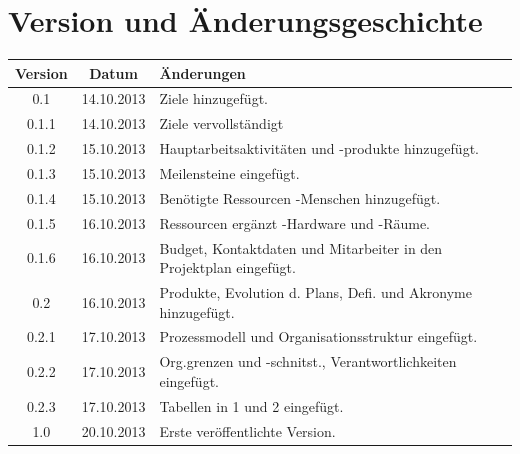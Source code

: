 \documentclass[fontsize=12pt,paper=a4,twoside]{scrartcl}
\begin{document}
\newpage

  \thispagestyle{fancy}
  \fancyhead{}
  \fancyfoot{}
  \renewcommand{\headrulewidth}{0.4pt}
  \tableofcontents

\newpage



\section*{Version und Änderungsgeschichte}



\begin{tabular}{ccl}
Version & Datum & Änderungen \\
\hline
0.1 & 14.10.2013 & Ziele hinzugefügt.\\
0.1.1 & 14.10.2013 & Ziele vervollständigt\\
0.1.2 & 15.10.2013 & Hauptarbeitsaktivitäten und -produkte hinzugefügt.\\
0.1.3 & 15.10.2013 & Meilensteine eingefügt.\\
0.1.4 & 15.10.2013 & Benötigte Ressourcen -Menschen hinzugefügt.\\
0.1.5 & 16.10.2013 & Ressourcen ergänzt -Hardware und -Räume.\\
0.1.6 & 16.10.2013 & Budget, Kontaktdaten und Mitarbeiter in den Projektplan eingefügt.\\
0.2 & 16.10.2013 &  Produkte, Evolution d. Plans, Defi. und Akronyme hinzugefügt.\\
0.2.1 & 17.10.2013 & Prozessmodell und Organisationsstruktur eingefügt.\\
0.2.2 & 17.10.2013 & Org.grenzen und -schnitst., Verantwortlichkeiten eingefügt.\\
0.2.3 & 17.10.2013 & Tabellen in 1 und 2 eingefügt.\\
1.0 & 20.10.2013 & Erste veröffentlichte Version. \\
\end{tabular}
\end{document}
